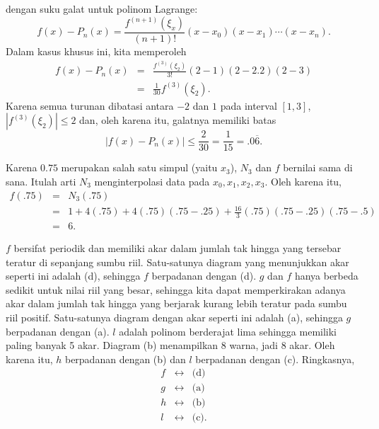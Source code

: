 \begin{description}
dengan suku galat untuk polinom Lagrange:
\[
f(x)-P_{n}(x)=\frac{f^{(n+1)}(\xi_{x})}{(n+1)!}(x-x_{0})(x-x_{1})\cdots(x-x_{n}).
\]
Dalam kasus khusus ini, kita memperoleh
\begin{eqnarray*}
f(x)-P_{n}(x) & = & \frac{f^{(3)}(\xi_{2})}{3!}(2-1)(2-2.2)(2-3)\\
 & = & \frac{1}{30}f^{(3)}(\xi_{2}).
\end{eqnarray*}
Karena semua turunan dibatasi antara $-2$ dan $1$ pada interval
$[1,3]$, $|f^{(3)}(\xi_{2})|\leq2$ dan, oleh karena itu, galatnya
memiliki batas
\[
|f(x)-P_{n}(x)|\leq\frac{2}{30}=\frac{1}{15}=.0\overline{6}.
\]
\item [{\ref{exc:interpolation-newton-11}:}] Karena $0.75$ merupakan
salah satu simpul (yaitu $x_{3}$), $N_{3}$ dan $f$ bernilai sama
di sana. Itulah arti $N_{3}$ menginterpolasi data pada $x_{0},x_{1},x_{2},x_{3}$.
Oleh karena itu,
\begin{eqnarray*}
f(.75) & = & N_{3}(.75)\\
 & = & 1+4(.75)+4(.75)(.75-.25)+\frac{16}{3}(.75)(.75-.25)(.75-.5)\\
 & = & 6.
\end{eqnarray*}
\item [{\ref{exc:interpolation-newton-12}:}] $f$ bersifat periodik dan
memiliki akar dalam jumlah tak hingga yang tersebar teratur di sepanjang
sumbu riil. Satu-satunya diagram yang menunjukkan akar seperti ini
adalah (d), sehingga $f$ berpadanan dengan (d). $g$ dan $f$ hanya
berbeda sedikit untuk nilai riil yang besar, sehingga kita dapat memperkirakan
adanya akar dalam jumlah tak hingga yang berjarak kurang lebih teratur
pada sumbu riil positif. Satu-satunya diagram dengan akar seperti
ini adalah (a), sehingga $g$ berpadanan dengan (a). $l$ adalah polinom
berderajat lima sehingga memiliki paling banyak 5 akar. Diagram (b)
menampilkan 8 warna, jadi 8 akar. Oleh karena itu, $h$ berpadanan
dengan (b) dan $l$ berpadanan dengan (c). Ringkasnya,
\begin{eqnarray*}
f & \leftrightarrow & \mbox{(d)}\\
g & \leftrightarrow & \mbox{(a)}\\
h & \leftrightarrow & \mbox{(b)}\\
l & \leftrightarrow & \mbox{(c)}.
\end{eqnarray*}
\end{description}

